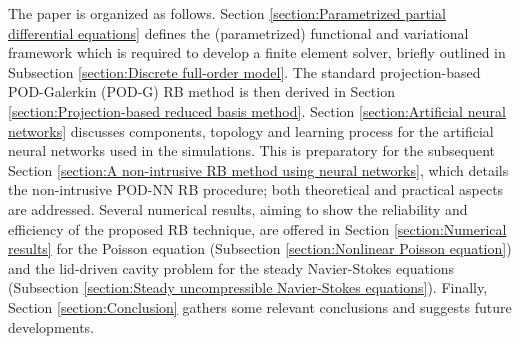 \documentclass{elsarticle}
\numberwithin{equation}{section}
\theoremstyle{theorem}
\theoremstyle{definition}
\theoremstyle{remark}
\theoremstyle{proposition}
\numberwithin{figure}{section}
\begin{document}

		
		The paper is organized as follows. Section \ref{section:Parametrized partial differential equations} defines the (parametrized) functional and variational framework which is required to develop a finite element solver, briefly outlined in Subsection \ref{section:Discrete full-order model}. The standard projection-based POD-Galerkin (POD-G) RB method is then derived in Section \ref{section:Projection-based reduced basis method}. Section \ref{section:Artificial neural networks} discusses components, topology and learning process for the artificial neural networks used in the simulations. This is preparatory for the subsequent Section \ref{section:A non-intrusive RB method using neural networks}, which details the non-intrusive POD-NN RB procedure; both theoretical and practical aspects are addressed. Several numerical results, aiming to show the reliability and efficiency of the proposed RB technique, are offered in Section \ref{section:Numerical results} for the Poisson equation (Subsection \ref{section:Nonlinear Poisson equation}) and the lid-driven cavity problem for the steady Navier-Stokes equations (Subsection \ref{section:Steady uncompressible Navier-Stokes equations}). Finally, Section \ref{section:Conclusion} gathers some relevant conclusions and suggests future developments.
		
\end{document}
